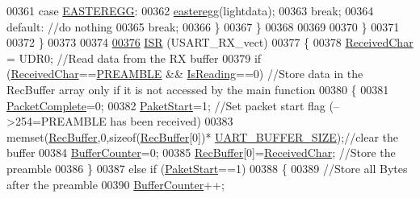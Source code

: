 \begin{DoxyCode}
{00361                 \textcolor{keywordflow}{case} \hyperlink{_led_effects_8h_a5645ec20d3cd39bfc1c9ad5ec99db2f2}{EASTEREGG}:
00362                     \hyperlink{_led_effects_8c_a25e09bcb1481b20ebc2a27e7098b5115}{easteregg}(lightdata);
00363                     \textcolor{keywordflow}{break};
00364                 \textcolor{keywordflow}{default}:    \textcolor{comment}{//do nothing}
00365                     \textcolor{keywordflow}{break};
00366             \}
00367         \}
00368         
00369         
00370     \}
00371       
00372 \}
00373 
00374 
\hypertarget{ws2811lichterkette_8c_source_l00376}{}\hyperlink{ws2811lichterkette_8c_a09ce999e15ad60b8a3f07d08af1946f9}{00376} \hyperlink{ws2811lichterkette_8c_a09ce999e15ad60b8a3f07d08af1946f9}{ISR} (USART\_RX\_vect)
00377 \{
00378     \hyperlink{globals_8h_ab5490074aaca289e986e9a00e0c25663}{ReceivedChar} = UDR0;                            \textcolor{comment}{//Read data from the RX buffer     }
00379     \textcolor{keywordflow}{if} (\hyperlink{globals_8h_ab5490074aaca289e986e9a00e0c25663}{ReceivedChar}==\hyperlink{ws2811lichterkette_8c_a8aac8c5098aaf915463fb31715efa09f}{PREAMBLE} && \hyperlink{globals_8h_a922ad5baed647eca43ad1a979e162ebd}{IsReading}==0)        \textcolor{comment}{//Store data in the
       RecBuffer array only if it is not accessed by the main function}
00380     \{
00381         \hyperlink{globals_8h_a1b09d1a5bcf4c8ab435bb3c9e36def59}{PacketComplete}=0;
00382         \hyperlink{globals_8h_aaa3bddd2273257ac5ec259197b62e984}{PaketStart}=1;                             \textcolor{comment}{//Set packet start flag (-->254=PREAMBLE has
       been received)}
00383         memset(\hyperlink{globals_8h_a5d735865707e6694a8173d629e0b4d5c}{RecBuffer},0,\textcolor{keyword}{sizeof}(\hyperlink{globals_8h_a5d735865707e6694a8173d629e0b4d5c}{RecBuffer}[0])*
      \hyperlink{globals_8h_a0d57378e32bf8278011460740bc29f7f}{UART\_BUFFER\_SIZE});\textcolor{comment}{//clear the buffer    }
00384         \hyperlink{globals_8h_aa6fcb4d4fca4554ac73bef10668c23cd}{BufferCounter}=0;
00385         \hyperlink{globals_8h_a5d735865707e6694a8173d629e0b4d5c}{RecBuffer}[0]=\hyperlink{globals_8h_ab5490074aaca289e986e9a00e0c25663}{ReceivedChar};                 \textcolor{comment}{//Store the preamble}
00386     \}
00387     \textcolor{keywordflow}{else} \textcolor{keywordflow}{if} (\hyperlink{globals_8h_aaa3bddd2273257ac5ec259197b62e984}{PaketStart}==1)
00388     \{
00389         \textcolor{comment}{//Store all Bytes after the preamble}
00390         \hyperlink{globals_8h_aa6fcb4d4fca4554ac73bef10668c23cd}{BufferCounter}++;    
}
\end{DoxyCode}
